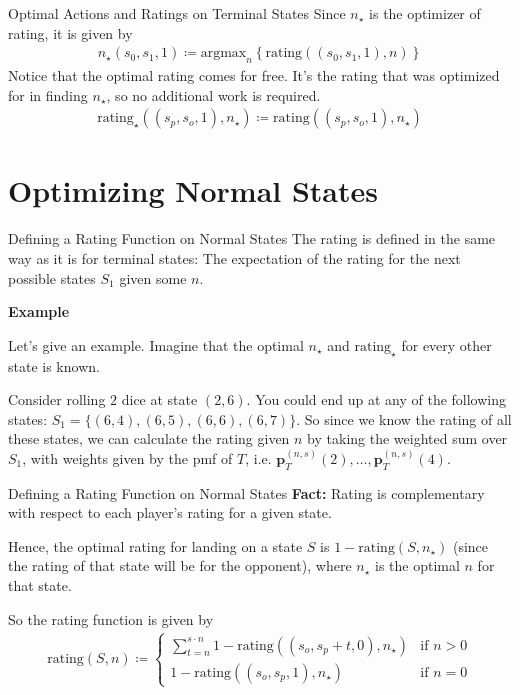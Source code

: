 \documentclass{beamer}
\begin{document}
\begin{frame}{Optimal Actions and Ratings on Terminal States}
    Since $n_{\star}$ is the optimizer of rating, it is given by
    \begin{align*}
        n_{\star}(s_0, s_1, 1) \coloneqq \text{argmax}_n \left\{ \text{rating}((s_0, s_1, 1), n) \right\}
    \end{align*}
    Notice that the optimal rating comes for free. It's the rating that was optimized for in finding $n_{\star}$, so no additional work is required.
    \begin{align*}
        \text{rating}_{\star}((s_p, s_o, 1), n_{\star}) \coloneqq \text{rating}((s_p, s_o, 1), n_{\star})
    \end{align*}
\end{frame}

\section{Optimizing Normal States}

\begin{frame}{Defining a Rating Function on Normal States}
    The rating is defined in the same way as it is for terminal states: The expectation of the rating for the next possible states $S_1$ given some $n$. 

    \textbf{Example}

    Let's give an example. Imagine that the optimal $n_{\star}$ and $\text{rating}_{\star}$ for every other state is known. 

    Consider rolling $2$ dice at state $(2, 6)$. You could end up at any of the following states: $S_1 = \{(6, 4), (6,5), (6,6), (6,7)\}$. So since we know the rating of all these states, we can calculate the rating given $n$ by taking the weighted sum over $S_1$, with weights given by the pmf of $T$, i.e. $\textbf{p}_{T}^{(n, s)}(2), \ldots, \textbf{p}_{T}^{(n, s)}(4)$.
\end{frame}

\begin{frame}{Defining a Rating Function on Normal States}
    \textbf{Fact:} Rating is complementary with respect to each player's rating for a given state.

    Hence, the optimal rating for landing on a state $S$ is $1-\text{rating}(S, n_{\star})$ (since the rating of that state will be for the opponent), where $n_{\star}$ is the optimal $n$ for that state. 


    So the rating function is given by
    \begin{align*}
        \text{rating}(S, n) \coloneqq \begin{cases}
            \sum_{t = n}^{s \cdot n} 1 - \text{rating}((s_o, s_p + t, 0), n_{\star}) & \text{if } n > 0 \\
            1- \text{rating}((s_o, s_p, 1), n_{\star}) & \text{if } n = 0
        \end{cases}
    \end{align*}
\end{frame}
\end{document}

